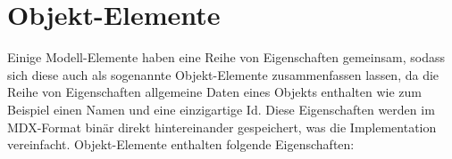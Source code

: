 \section { Objekt-Elemente }
Einige Modell-Elemente haben eine Reihe von Eigenschaften gemeinsam, sodass sich diese auch als sogenannte Objekt-Elemente zusammenfassen lassen, da die Reihe von Eigenschaften allgemeine Daten eines Objekts enthalten wie zum Beispiel einen Namen und eine einzigartige Id. Diese Eigenschaften werden im MDX-Format binär direkt hintereinander gespeichert, was die Implementation vereinfacht.
Objekt-Elemente enthalten folgende Eigenschaften:

